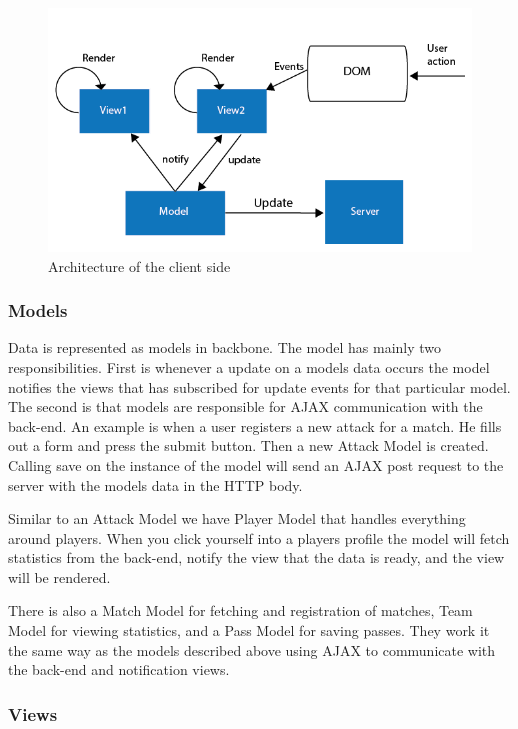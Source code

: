 \begin{figure}[ht!]
\centering
\includegraphics[width=1\textwidth]{images/architecture/backbone_architecture.png}
\caption{Architecture of the client side}
\label{overflow}
\end{figure}

\subsubsection{Models}

Data is represented as models in backbone. The model has mainly two responsibilities. First is whenever a update on a models data occurs the model notifies the views that has subscribed for update events for that particular model. The second is that models are responsible for AJAX communication with the back-end. An example is when a user registers a new attack for a match. He fills out a form and press the submit button. Then a new Attack Model is created. Calling save on the instance of the model will send an AJAX post request to the server with the models data in the HTTP body.

Similar to an Attack Model we have Player Model that handles everything around players. When you click yourself into a players profile the model will fetch statistics from the back-end, notify the view that the data is ready, and the view will be rendered.

There is also a Match Model for fetching and registration of matches, Team Model for viewing statistics, and a Pass Model for saving passes. They work it the same way as the models described above using AJAX to communicate with the back-end and notification views.

\subsubsection{Views}

